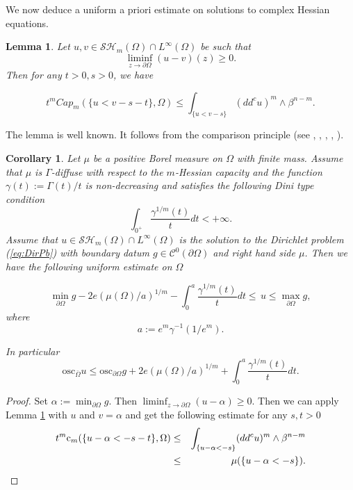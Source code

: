 \documentclass[12pt]{amsart}
\newtheorem{lemma}[theorem]{Lemma}
\newtheorem{corollary}[theorem]{Corollary}
\theoremstyle{definition}
\numberwithin{theorem}{section}
\numberwithin{equation}{section}
\begin{document}
{\smallskip
We now deduce a uniform a priori estimate on solutions to  complex Hessian equations. 

\begin{lemma} \label{lem:CapEst} Let $u, v \in  \mathcal{SH}_m (\Omega) \cap L^{\infty} (\Omega)$ be such that 
$$
 \liminf_{z\to \partial\Omega}(u-v)(z)\geq 0.
$$
 Then for any $t > 0, s > 0$, we have


 \begin{equation}\label{eq:CapEst}
 t^m {Cap}_m(\{u< v -s-t\},\Omega)\leq \int_{\{u<v -s\}}(dd^cu)^m\wedge\beta^{n-m}.
\end{equation}
\end{lemma}
The  lemma is well known. It follows from the comparison principle (see \cite{Kol96}, \cite{EGZ09}, \cite{GKZ08}, \cite{Ch16a}, \cite{KN19}).

\begin{corollary} \label{cor:UnifEst} Let  $\mu$ be a positive Borel measure on $\Omega$ with finite mass.
Assume that $\mu$ is $\Gamma$-diffuse  with respect to  the $m$-Hessian capacity and the function  $ \gamma (t) := \Gamma (t) \slash t$ is non-decreasing and
satisfies the following Dini type condition
\begin{equation} \label{eq:DiniConditionMu}
\int_{0^+}  \frac{\gamma^{1 \slash m} (t)}{t} d t < + \infty.
\end{equation}
Assume that $u \in \mathcal{SH}_m (\Omega) \cap L^{\infty} (\Omega)$ is the solution to the Dirichlet problem (\ref{eq:DirPb}) with boundary datum $g \in \mathcal{C}^0 (\partial \Omega)$ and right hand side $\mu$.  Then we have the following uniform estimate on $\Omega$ 


\begin{equation} \label{eq:UnifEst} 
 \min_{\partial \Omega} g -  2  e \left(\mu (\Omega)\slash a\right)^{1 \slash m}  -  \int_0^{a} \frac{\gamma^{1 \slash m} (t)}{t} d t \leq  \,  u \leq \max_{\partial \Omega} g,
 \end{equation}
  where
  $$
   a := e^m \gamma^{-1} (1\slash e^m).
  $$
  
In particular
 \begin{equation} \label{eq:UnifOsc} 
 \mathrm{osc}_{\bar \Omega} u \leq \mathrm{osc}_{\partial  \Omega} g +2  e \left(\mu (\Omega)\slash a\right)^{1 \slash m}  + \int_0^{a }\frac{\gamma^{1 \slash m} (t)}{t} d t.
 \end{equation}
\end{corollary}
\begin{proof} Set $ \alpha := \min_{\partial \Omega} g$. Then $\liminf_{z \to \partial \Omega} (u - \alpha) \geq 0$.
Then we can apply Lemma \ref{lem:CapEst} with $u $ and $v = \alpha$ and get the following estimate for any $s, t > 0$
\begin{eqnarray} \label{eq:CapEst2}
t^m \hbox{c}_m  (\{u - \alpha <  - s - t\},\Omega)  &\leq & \int_{\{u - \alpha < - s\}} (dd^c u)^m \wedge \beta^{n-m}  \nonumber \\
&  \leq & \mu (\{u - \alpha < - s\} ).
\end{eqnarray}


\end{proof}}
\end{document}
